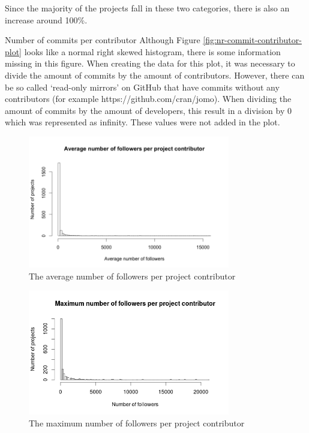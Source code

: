 \begin{LaTeXdescription}
    	Since the majority of the projects fall in these two categories, there is also an increase around 100\%.
    	\item[Number of commits per contributor]
    	Although Figure \ref{fig:nr-commit-contributor-plot} looks like a normal right skewed histogram, there is some information missing in this figure.
    	When creating the data for this plot, it was necessary to divide the amount of commits by the amount of contributors.
    	However, there can be so called `read-only mirrors' on GitHub that have commits without any contributors (for example https://github.com/cran/jomo).
    	When dividing the amount of commits by the amount of developers, this result in a division by 0 which was represented as infinity.
    	These values were not added in the plot. 
    	\end{LaTeXdescription}
        
	    \begin{figure}
	        \includegraphics[width=250pt]{figures/average-number-of-followers-per-project-contributor}
	        \caption{The average number of followers per project contributor}
	        \label{fig:avg-follower-contributor-plot}
	    \end{figure}

	    \begin{figure}
	        \includegraphics[width=250pt]{figures/maximum-number-of-followers-per-project-contributor}
	        \caption{The maximum number of followers per project contributor}
	        \label{fig:max-follower-contributor-plot}
	    \end{figure}

